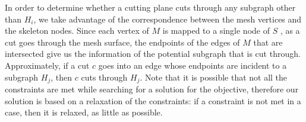 
In order to determine whether a cutting plane cuts through any subgraph other than $H_i$, we take advantage of the correspondence between the mesh vertices and the skeleton nodes. Since each vertex of $M$ is mapped to a single node of $S$ \cite{AuTCCL08}, as a cut goes through the mesh surface, the endpoints of the edges of $M$ that are intersected give us the information of the potential subgraph that is cut through. Approximately, if a cut $c$ goes into an edge whose endpoints are incident to a subgraph $H_j$, then $c$ cuts through $H_j$. Note that it is possible that not all the constraints are met while searching for a solution for the objective, therefore our solution is based on a relaxation of the constraints: if a constraint is not met in a case, then it is relaxed, as little as possible.



